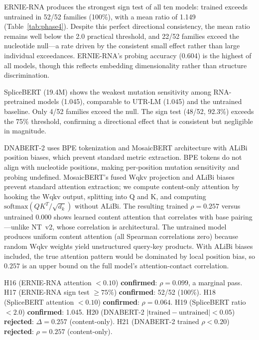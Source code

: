 \documentclass[11pt]{article}
\begin{document}
ERNIE-RNA produces the strongest sign test of all ten models: trained
exceeds untrained in 52/52 families (100\%), with a mean ratio of
1.149 (Table~\ref{tab:phase4}).  Despite this perfect directional
consistency, the mean ratio remains well below the 2.0 practical
threshold, and 22/52 families exceed the nucleotide null---a rate
driven by the consistent small effect rather than large individual
exceedances.  ERNIE-RNA's probing accuracy (0.604) is the highest of
all models, though this reflects embedding dimensionality rather than
structure discrimination.

SpliceBERT (19.4M) shows the weakest mutation sensitivity among
RNA-pretrained models (1.045), comparable to UTR-LM (1.045) and the
untrained baseline.  Only 4/52 families exceed the null.  The sign
test (48/52, 92.3\%) exceeds the 75\% threshold, confirming a
directional effect that is consistent but negligible in magnitude.

DNABERT-2 uses BPE tokenization and MosaicBERT architecture with
ALiBi position biases, which prevent standard metric extraction.  BPE
tokens do not align with nucleotide positions, making per-position
mutation sensitivity and probing undefined.  MosaicBERT's fused Wqkv
projection and ALiBi biases prevent standard attention extraction;
we compute content-only attention by hooking the Wqkv output,
splitting into Q and K, and computing $\mathrm{softmax}(QK^T / \sqrt{d_k})$
without ALiBi.  The resulting trained $\rho = 0.257$ versus untrained
$0.000$ shows learned content attention that correlates with base
pairing---unlike NT~v2, whose correlation is architectural.  The
untrained model produces uniform content attention (all Spearman
correlations zero) because random Wqkv weights yield unstructured
query-key products.  With ALiBi biases included, the true attention
pattern would be dominated by local position bias, so $0.257$ is an
upper bound on the full model's attention-contact correlation.

H16 (ERNIE-RNA attention $< 0.10$) \textbf{confirmed}: $\rho =
0.099$, a marginal pass.  H17 (ERNIE-RNA sign test $\geq 75\%$)
\textbf{confirmed}: 52/52 (100\%).  H18 (SpliceBERT attention $<
0.10$) \textbf{confirmed}: $\rho = 0.064$.  H19 (SpliceBERT ratio
$< 2.0$) \textbf{confirmed}: 1.045.  H20 (DNABERT-2
$|\text{trained} - \text{untrained}| < 0.05$) \textbf{rejected}:
$\Delta = 0.257$ (content-only).  H21 (DNABERT-2 trained $\rho <
0.20$) \textbf{rejected}: $\rho = 0.257$ (content-only).


\end{document}
